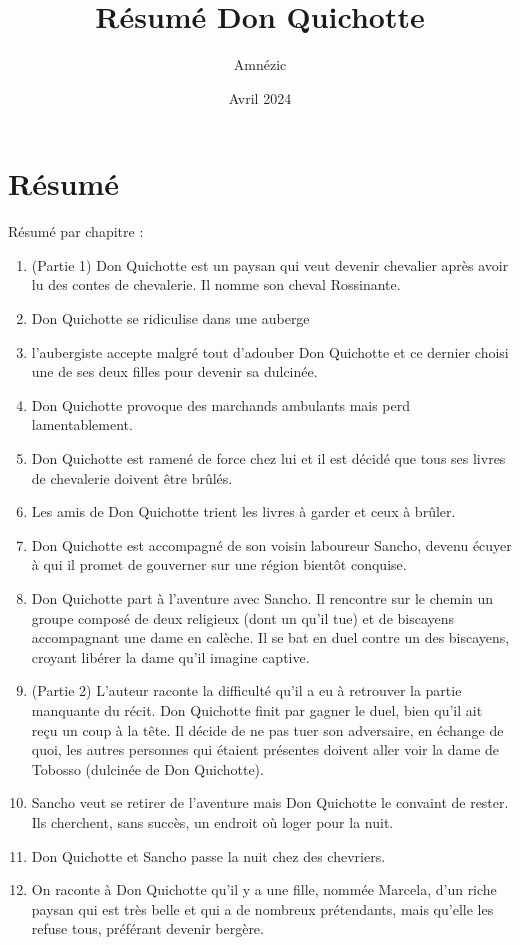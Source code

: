\documentclass{article}
\author{Amnézic}
\date{Avril 2024}
\title{Résumé Don Quichotte}
\begin{document}
\maketitle
\newpage
\section{Résumé}
Résumé par chapitre :
\begin{enumerate}
    \item (Partie 1) Don Quichotte est un paysan qui veut devenir chevalier après avoir lu des contes de chevalerie. Il nomme son cheval Rossinante.
    \item Don Quichotte se ridiculise dans une auberge
    \item l'aubergiste accepte malgré tout d'adouber Don Quichotte et ce dernier choisi une de ses deux filles pour devenir sa dulcinée.
    \item Don Quichotte provoque des marchands ambulants mais perd lamentablement.
    \item Don Quichotte est ramené de force chez lui et il est décidé que tous ses livres de chevalerie doivent être brûlés.
    \item Les amis de Don Quichotte trient les livres à garder et ceux à brûler.
    \item Don Quichotte est accompagné de son voisin laboureur Sancho, devenu écuyer à qui il promet de gouverner sur une région bientôt conquise.
    \item Don Quichotte part à l'aventure avec Sancho. Il rencontre sur le chemin un groupe composé de deux religieux (dont un qu'il tue) et de biscayens accompagnant une dame en calèche. Il se bat en duel contre un des biscayens, croyant libérer la dame qu'il imagine captive. 
    \item (Partie 2) L'auteur raconte la difficulté qu'il a eu à retrouver la partie manquante du récit. Don Quichotte finit par gagner le duel, bien qu'il ait reçu un coup à la tête. Il décide de ne pas tuer son adversaire, en échange de quoi, les autres personnes qui étaient présentes doivent aller voir la dame de Tobosso (dulcinée de Don Quichotte).
    \item Sancho veut se retirer de l'aventure mais Don Quichotte le convaint de rester. Ils cherchent, sans succès, un endroit où loger pour la nuit.
    \item Don Quichotte et Sancho passe la nuit chez des chevriers.
    \item On raconte à Don Quichotte qu'il y a une fille, nommée Marcela, d'un riche paysan qui est très belle et qui a de nombreux prétendants, mais qu'elle les refuse tous, préférant devenir bergère.

\end{enumerate}
\end{document}
